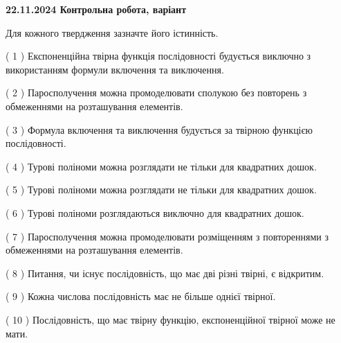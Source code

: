 \documentclass[12pt, ukrainian]{article}
\begin{document}
\vspace{4mm}
\newpage
\begin {large}

\textbf{22.11.2024 Контрольна робота, варіант  }\par


{
Для кожного твердження зазначте його істинність.\par
\vspace{2mm}
( 1 ) Експоненційна твірна функція послідовності будується виключно з використанням формули включення та виключення.%

( 2 ) Паросполучення можна промоделювати сполукою без повторень з обмеженнями на розташування елементів.%

( 3 ) Формула включення та виключення будується за твірною функцією послідовності.%

( 4 ) Турові поліноми можна розглядати не тільки для квадратних дошок.%

( 5 ) Турові поліноми можна розглядати не тільки для квадратних дошок.%

( 6 ) Турові поліноми розглядаються виключно для квадратних дошок.%

( 7 ) Паросполучення можна промоделювати розміщенням з повтореннями з обмеженнями на розташування елементів.%

( 8 ) Питання, чи існує послідовність, що має дві різні твірні, є відкритим.%

( 9 ) Кожна числова послідовність має не більше однієї твірної.%

( 10 ) Послідовність, що має твірну функцію, експоненційної твірної може не мати.%


\vspace{5mm}
}
\end {large}
\end{document}
